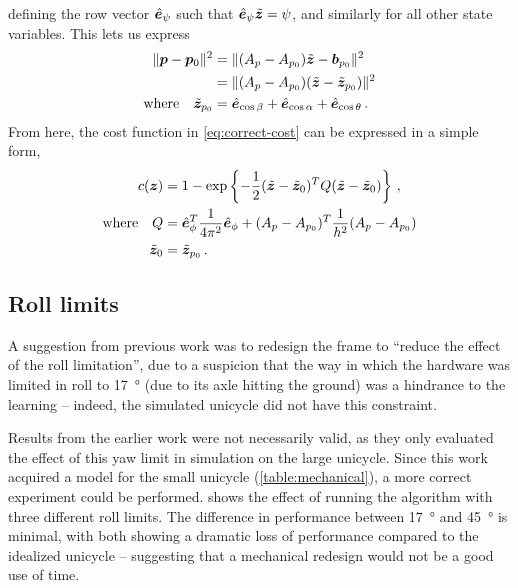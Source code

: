 \documentclass[main.tex]{subfiles}
\begin{document}
	defining the row vector $\hat{\bm{e}}_{\psi}$ such that $\hat{\bm{e}}_{\psi}\tilde{\bm{z}} = \psi$, and similarly for all other state variables.
	This lets us express
	\begin{align}
		\|\bm{p} - \bm{p}_0\|^2
			&= \|(A_p - A_{p_0})\tilde{\bm{z}} - \bm{b}_{p_0}\|^2  \nonumber \\
			&= \|(A_p - A_{p_0})(\tilde{\bm{z}} - \tilde{\bm{z}}_{p_0})\|^2 \\
		\text{where}\quad\tilde{\bm{z}}_{p_0}
			&= \hat{\bm{e}}_{\cos \beta} + \hat{\bm{e}}_{\cos \alpha} + \hat{\bm{e}}_{\cos \theta}\,.  \nonumber
	\end{align}
	From here, the cost function in \cref{eq:correct-cost} can be expressed in a simple form,
	\begin{align}
		c(\bm z) &= 1 - \exp\left\{-\frac{1}{2}
			(\tilde{\bm{z}} - \tilde{\bm{z}}_0)^T  Q (\tilde{\bm{z}} - \tilde{\bm{z}}_0)
		\right\} \,, \label{eq:quad-cost} \\
		\text{where}\quad Q &=
			\hat{\bm{e}}_{\phi}^T\frac{1}{4\pi^2}\hat{\bm{e}}_{\phi} +
			(A_p - A_{p_0})^T\frac{1}{h^2}(A_p - A_{p_0}) \nonumber \\
			\tilde{\bm{z}}_0 &= \tilde{\bm{z}}_{p_0}\,. \nonumber
	\end{align}

\subsection{Roll limits}
	\label{sec:roll-cost}
	A suggestion from previous work was to redesign the frame to \enquote{reduce the effect of the roll limitation}\cite[p.~35]{aleksi}, due to a suspicion that the way in which the hardware was limited in roll to \SI{17}{\degree} (due to its axle hitting the ground) was a hindrance to the learning -- indeed, the simulated unicycle did not have this constraint.

	Results from the earlier work were not necessarily valid, as they only evaluated the effect of this yaw limit in simulation on the large unicycle.
	Since this work acquired a model for the small unicycle (\cref{table:mechanical}), a more correct experiment could be performed.
	 shows the effect of running the algorithm with three different roll limits.
	The difference in performance between \SI{17}{\degree} and \SI{45}{\degree} is minimal, with both showing a dramatic loss of performance compared to the idealized unicycle -- suggesting that a mechanical redesign would not be a good use of time.
\end{document}

